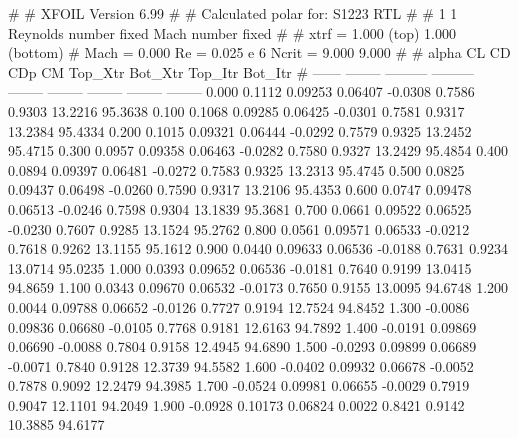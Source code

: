 #  
#       XFOIL         Version 6.99
#  
# Calculated polar for: S1223 RTL                                       
#  
# 1 1 Reynolds number fixed          Mach number fixed         
#  
# xtrf =   1.000 (top)        1.000 (bottom)  
# Mach =   0.000     Re =     0.025 e 6     Ncrit =   9.000  9.000
#  
#   alpha    CL        CD       CDp       CM     Top_Xtr  Bot_Xtr  Top_Itr  Bot_Itr
#  ------ -------- --------- --------- -------- -------- -------- -------- --------
   0.000   0.1112   0.09253   0.06407  -0.0308   0.7586   0.9303  13.2216  95.3638
   0.100   0.1068   0.09285   0.06425  -0.0301   0.7581   0.9317  13.2384  95.4334
   0.200   0.1015   0.09321   0.06444  -0.0292   0.7579   0.9325  13.2452  95.4715
   0.300   0.0957   0.09358   0.06463  -0.0282   0.7580   0.9327  13.2429  95.4854
   0.400   0.0894   0.09397   0.06481  -0.0272   0.7583   0.9325  13.2313  95.4745
   0.500   0.0825   0.09437   0.06498  -0.0260   0.7590   0.9317  13.2106  95.4353
   0.600   0.0747   0.09478   0.06513  -0.0246   0.7598   0.9304  13.1839  95.3681
   0.700   0.0661   0.09522   0.06525  -0.0230   0.7607   0.9285  13.1524  95.2762
   0.800   0.0561   0.09571   0.06533  -0.0212   0.7618   0.9262  13.1155  95.1612
   0.900   0.0440   0.09633   0.06536  -0.0188   0.7631   0.9234  13.0714  95.0235
   1.000   0.0393   0.09652   0.06536  -0.0181   0.7640   0.9199  13.0415  94.8659
   1.100   0.0343   0.09670   0.06532  -0.0173   0.7650   0.9155  13.0095  94.6748
   1.200   0.0044   0.09788   0.06652  -0.0126   0.7727   0.9194  12.7524  94.8452
   1.300  -0.0086   0.09836   0.06680  -0.0105   0.7768   0.9181  12.6163  94.7892
   1.400  -0.0191   0.09869   0.06690  -0.0088   0.7804   0.9158  12.4945  94.6890
   1.500  -0.0293   0.09899   0.06689  -0.0071   0.7840   0.9128  12.3739  94.5582
   1.600  -0.0402   0.09932   0.06678  -0.0052   0.7878   0.9092  12.2479  94.3985
   1.700  -0.0524   0.09981   0.06655  -0.0029   0.7919   0.9047  12.1101  94.2049
   1.900  -0.0928   0.10173   0.06824   0.0022   0.8421   0.9142  10.3885  94.6177
